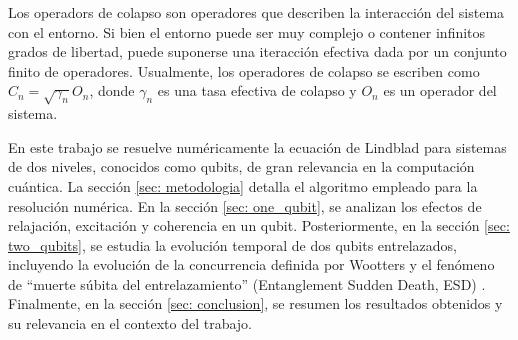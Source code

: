 Los operadors de colapso son operadores que describen la interacción del sistema con el entorno. Si bien el entorno puede ser muy complejo o contener infinitos grados de libertad, puede suponerse una iteracción efectiva dada por un conjunto finito de operadores. Usualmente, los operadores de colapso se escriben como
\(C_n = \sqrt{\gamma_n} O_n\), donde \(\gamma_n\) es una tasa efectiva de colapso y \(O_n\) es un operador del sistema.

En este trabajo se resuelve numéricamente la ecuación de Lindblad para sistemas de dos niveles, conocidos como qubits, de gran relevancia en la computación cuántica. La sección \ref{sec: metodologia} detalla el algoritmo empleado para la resolución numérica. En la sección \ref{sec: one_qubit}, se analizan los efectos de relajación, excitación y coherencia en un qubit. Posteriormente, en la sección \ref{sec: two_qubits}, se estudia la evolución temporal de dos qubits entrelazados, incluyendo la evolución de la concurrencia definida por Wootters \cite{Wootters} y el fenómeno de ``muerte súbita del entrelazamiento'' (Entanglement Sudden Death, ESD) \cite{ESD}. Finalmente, en la sección \ref{sec: conclusion}, se resumen los resultados obtenidos y su relevancia en el contexto del trabajo. 

